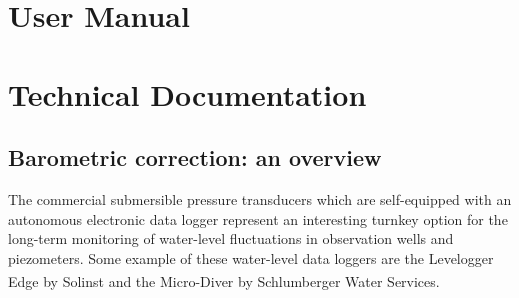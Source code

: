 \documentclass[12pt, letterpaper, fleqn]{report}
\begin{document}


\listoffigures

\tableofcontents

\part{User Manual}





\part{Technical Documentation}

\chapter{Barometric correction: an overview}

The commercial submersible pressure transducers which are self-equipped with an autonomous electronic data logger represent an interesting turnkey option for the long-term monitoring of water-level fluctuations in observation wells and piezometers. Some example of these water-level data loggers are the Levelogger Edge\textsuperscript{\textregistered} by Solinst and the Micro-Diver\textsuperscript{\textregistered} by Schlumberger Water Services. 
\end{document}
